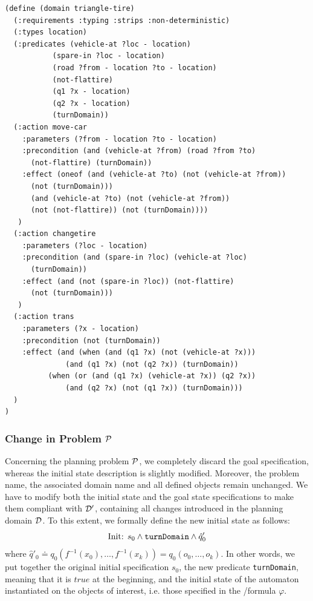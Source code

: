 \begin{example}
\begin{lstlisting}[language=PDDL, escapechar=£]
(define (domain triangle-tire)
  (:requirements :typing :strips :non-deterministic)
  (:types location)
  (:predicates (vehicle-at ?loc - location)
	       (spare-in ?loc - location)
	       (road ?from - location ?to - location)
	       (not-flattire)
	       (q1 ?x - location)
	       (q2 ?x - location)
	       (turnDomain))
  (:action move-car
    :parameters (?from - location ?to - location)
    :precondition (and (vehicle-at ?from) (road ?from ?to) 
      (not-flattire) (turnDomain))
    :effect (oneof (and (vehicle-at ?to) (not (vehicle-at ?from))
      (not (turnDomain)))
	  (and (vehicle-at ?to) (not (vehicle-at ?from)) 
	  (not (not-flattire)) (not (turnDomain))))
   )
  (:action changetire
    :parameters (?loc - location)
    :precondition (and (spare-in ?loc) (vehicle-at ?loc) 
      (turnDomain))
    :effect (and (not (spare-in ?loc)) (not-flattire)
      (not (turnDomain)))
   )
  (:action trans
    :parameters (?x - location)
    :precondition (not (turnDomain))
    :effect (and (when (and (q1 ?x) (not (vehicle-at ?x)))
              (and (q1 ?x) (not (q2 ?x)) (turnDomain))
          (when (or (and (q1 ?x) (vehicle-at ?x)) (q2 ?x))
              (and (q2 ?x) (not (q1 ?x)) (turnDomain)))
  )   
)
\end{lstlisting}
\end{example}

\subsubsection*{Change in Problem $\P$}
Concerning the planning problem $\P$, we completely discard the goal specification, whereas the initial state description is slightly modified. Moreover, the problem name, the associated domain name and all defined objects remain unchanged. We have to modify both the initial state and the goal state specifications to make them compliant with $\D'$, containing all changes introduced in the planning domain $\D$. To this extent, we formally define the new initial state as follows:
\begin{equation}
\text{Init: } s_0 \lAND \text{\texttt{turnDomain}} \lAND \hat{q}'_0
\end{equation}
where $\hat{q}'_0 \doteq q_0(f^{-1}(x_0),\dots,f^{-1}(x_k)) = q_0(o_0,\dots,o_k)$. In other words, we put together the original initial specification $s_0$, the new predicate \texttt{turnDomain}, meaning that it is $true$ at the beginning, and the initial state of the automaton instantiated on the objects of interest, i.e. those specified in the \LTLf/\PLTL formula $\varphi$. 


